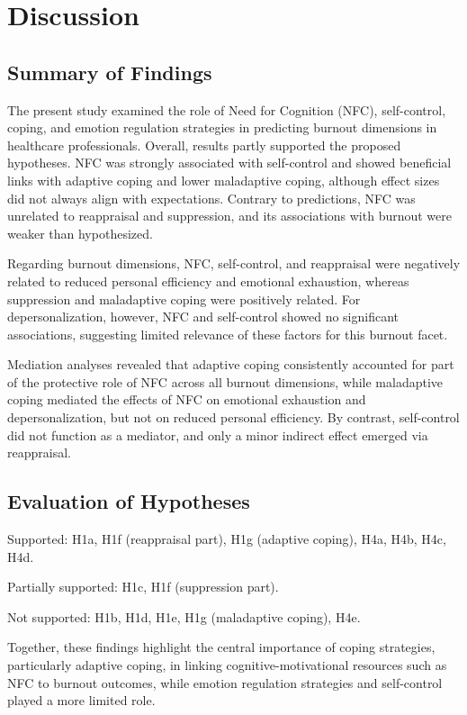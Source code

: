 \documentclass[
  man]{apa6}
\begin{document}
\section{Discussion}\label{discussion}

\subsection{Summary of Findings}\label{summary-of-findings}

The present study examined the role of Need for Cognition (NFC), self-control, coping, and emotion regulation strategies in predicting burnout dimensions in healthcare professionals. Overall, results partly supported the proposed hypotheses. NFC was strongly associated with self-control and showed beneficial links with adaptive coping and lower maladaptive coping, although effect sizes did not always align with expectations. Contrary to predictions, NFC was unrelated to reappraisal and suppression, and its associations with burnout were weaker than hypothesized.

Regarding burnout dimensions, NFC, self-control, and reappraisal were negatively related to reduced personal efficiency and emotional exhaustion, whereas suppression and maladaptive coping were positively related. For depersonalization, however, NFC and self-control showed no significant associations, suggesting limited relevance of these factors for this burnout facet.

Mediation analyses revealed that adaptive coping consistently accounted for part of the protective role of NFC across all burnout dimensions, while maladaptive coping mediated the effects of NFC on emotional exhaustion and depersonalization, but not on reduced personal efficiency. By contrast, self-control did not function as a mediator, and only a minor indirect effect emerged via reappraisal.

\subsection{Evaluation of Hypotheses}\label{evaluation-of-hypotheses}

Supported: H1a, H1f (reappraisal part), H1g (adaptive coping), H4a, H4b, H4c, H4d.

Partially supported: H1c, H1f (suppression part).

Not supported: H1b, H1d, H1e, H1g (maladaptive coping), H4e.

Together, these findings highlight the central importance of coping strategies, particularly adaptive coping, in linking cognitive-motivational resources such as NFC to burnout outcomes, while emotion regulation strategies and self-control played a more limited role.
\end{document}
